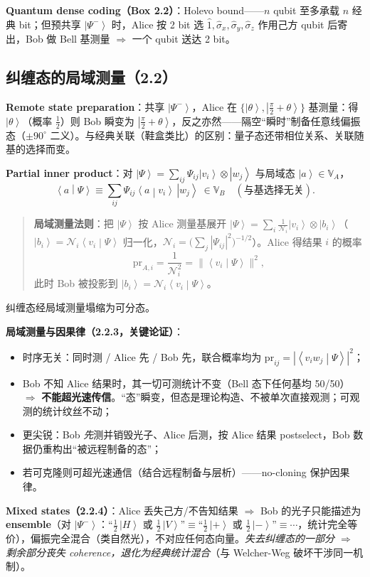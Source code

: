 \documentclass[11pt]{ctexart}
\newcommand{\ket}[1]{\left|#1\right\rangle}
\newcommand{\braket}[2]{\left\langle#1\middle|#2\right\rangle}
\newcommand{\op}[1]{\hat{#1}}
\begin{document}
\textbf{Quantum dense coding（Box 2.2）}：Holevo bound——$n$ qubit 至多承载 $n$ 经典 bit；但预共享 $\ket{\Psi^-}$ 时，Alice 按 2 bit 选 $\op1,\op\sigma_x,\op\sigma_y,\op\sigma_z$ 作用己方 qubit 后寄出，Bob 做 Bell 基测量 $\Rightarrow$ 一个 qubit 送达 2 bit。

\subsection{纠缠态的局域测量（2.2）}

\textbf{Remote state preparation}：共享 $\ket{\Psi^-}$，Alice 在 $\{\ket\theta,\ket{\tfrac\pi2+\theta}\}$ 基测量：得 $\ket\theta$（概率 $\tfrac12$）则 Bob 瞬变为 $\ket{\tfrac\pi2+\theta}$，反之亦然——隔空``瞬时''制备任意线偏振态（$\pm90^\circ$ 二义）。与经典关联（鞋盒类比）的区别：量子态还带相位关系、关联随基的选择而变。

\textbf{Partial inner product}：对 $\ket\Psi=\sum_{ij}\Psi_{ij}\ket{v_i}\otimes\ket{w_j}$ 与局域态 $\ket a\in\mathbb V_A$，
\[
\braket a\Psi\equiv\sum_{ij}\Psi_{ij}\braket a{v_i}\,\ket{w_j}\ \in\mathbb V_B\quad(\text{与基选择无关}).
\]

\begin{quote}
\textbf{局域测量法则}：把 $\ket\Psi$ 按 Alice 测量基展开 $\ket\Psi=\sum_i\frac{1}{\mathcal N_i}\ket{v_i}\otimes\ket{b_i}$（$\ket{b_i}=\mathcal N_i\braket{v_i}\Psi$ 归一化，$\mathcal N_i=\big(\sum_j|\Psi_{ij}|^2\big)^{-1/2}$）。Alice 得结果 $i$ 的概率
\[
\mathrm{pr}_{A,i}=\frac{1}{\mathcal N_i^2}=\big\|\braket{v_i}\Psi\big\|^2,
\]
此时 Bob 被投影到 $\ket{b_i}=\mathcal N_i\braket{v_i}{\Psi}$。
\end{quote}
纠缠态经局域测量塌缩为可分态。

\textbf{局域测量与因果律（2.2.3，关键论证）}：
\begin{itemize}
\item 时序无关：同时测 / Alice 先 / Bob 先，联合概率均为 $\mathrm{pr}_{ij}=|\braket{v_iw_j}{\Psi}|^2$；
\item Bob 不知 Alice 结果时，其一切可测统计不变（Bell 态下任何基均 50/50）$\Rightarrow$ \textbf{不能超光速传信}。``态''瞬变，但态是理论构造、不被单次直接观测；可观测的统计纹丝不动；
\item 更尖锐：Bob \emph{先}测并销毁光子、Alice 后测，按 Alice 结果 postselect，Bob 数据仍重构出``被远程制备的态''；
\item 若可克隆则可超光速通信（结合远程制备与层析）——no-cloning 保护因果律。
\end{itemize}

\textbf{Mixed states（2.2.4）}：Alice 丢失己方/不告知结果 $\Rightarrow$ Bob 的光子只能描述为 \textbf{ensemble}（对 $\ket{\Psi^-}$：``$\tfrac12\,\ket H$ 或 $\tfrac12\,\ket V$''$\equiv$``$\tfrac12\,\ket+$ 或 $\tfrac12\,\ket-$''$\equiv\cdots$，统计完全等价），偏振完全混合（类自然光），不对应任何态向量。\emph{失去纠缠态的一部分 $\Rightarrow$ 剩余部分丧失 coherence，退化为经典统计混合}（与 Welcher-Weg 破坏干涉同一机制）。
\end{document}
